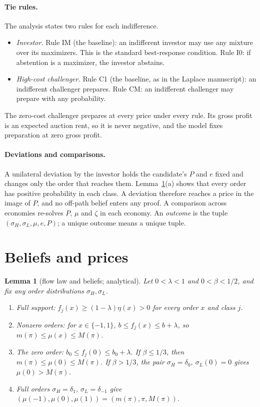 \documentclass[11pt]{article}
\newtheorem{lemma}{Lemma}
\theoremstyle{definition}
\begin{document}
\paragraph{Tie rules.} The analysis states two rules for each indifference.
\begin{itemize}
\item \emph{Investor.} Rule IM (the baseline): an indifferent investor may use any mixture over its maximizers.
  This is the standard best-response condition. Rule I0: if abstention is a maximizer, the investor abstains.
\item \emph{High-cost challenger.} Rule C1 (the baseline, as in the Laplace manuscript): an indifferent
  challenger prepares. Rule CM: an indifferent challenger may prepare with any probability.
\end{itemize}
The zero-cost challenger prepares at every price under every rule. Its gross profit is an expected auction
rent, so it is never negative, and the model fixes preparation at zero gross profit.

\paragraph{Deviations and comparisons.} A unilateral deviation by the investor holds the candidate's $P$ and
$e$ fixed and changes only the order that reaches them. Lemma~\ref{lem:flow}(a) shows that every order has
positive probability in each class. A deviation therefore reaches a price in the image of $P$, and no
off-path belief enters any proof. A comparison across economies re-solves $P$, $\mu$ and $\zeta$ in each economy.
An \emph{outcome} is the tuple $(\sigma_H,\sigma_L,\mu,e,P)$; a unique outcome means a unique tuple.

\section{Beliefs and prices}\label{sec:beliefs}

\begin{lemma}[flow law and beliefs; analytical]\label{lem:flow}
Let $0<\lambda<1$ and $0<\beta<1/2$, and fix any order distributions $\sigma_H,\sigma_L$.
\begin{enumerate}[label=(\alph*)]
\item Full support: $f_j(x)\ge(1-\lambda)\eta(x)>0$ for every order $x$ and class $j$.
\item Nonzero orders: for $x\in\{-1,1\}$, $b\le f_j(x)\le b+\lambda$, so $m(\pi)\le\mu(x)\le M(\pi)$.
\item The zero order: $b_0\le f_j(0)\le b_0+\lambda$. If $\beta\le1/3$, then $m(\pi)\le\mu(0)\le M(\pi)$.
  If $\beta>1/3$, the pair $\sigma_H=\delta_0$, $\sigma_L(0)=0$ gives $\mu(0)>M(\pi)$.
\item Full orders $\sigma_H=\delta_1$, $\sigma_L=\delta_{-1}$ give $(\mu(-1),\mu(0),\mu(1))=(m(\pi),\pi,M(\pi))$.
\end{enumerate}
\end{lemma}
\end{document}
